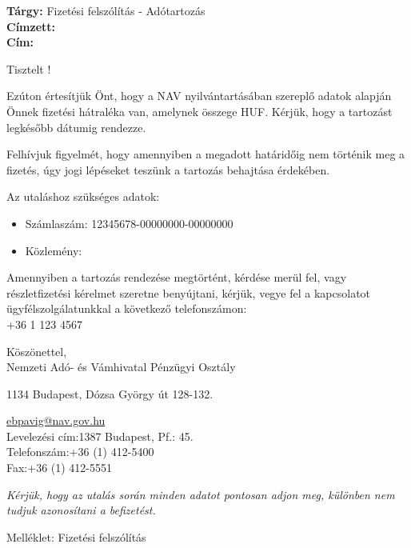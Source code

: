 \documentclass[a4paper,12pt]{letter}
\begin{document}
    \pagestyle{fancy}
    \fancyhf{}
    \fancyhead[R]{\today}
    \fancyfoot[C]{\thepage}


    \begin{flushleft}
        \textbf{Tárgy:} Fizetési felszólítás - Adótartozás \\ [1em]
        \textbf{Címzett:} \nev \\ [1em]
        \textbf{Cím:} \cim
    \end{flushleft}

    \vspace{1.5em}

    Tisztelt \nev!

    Ezúton értesítjük Önt, hogy a NAV nyilvántartásában szereplő adatok alapján Önnek fizetési hátraléka van, amelynek összege \osszeg HUF. Kérjük, hogy a tartozást legkésőbb \hatarido dátumig rendezze.

    Felhívjuk figyelmét, hogy amennyiben a megadott határidőig nem történik meg a fizetés, úgy jogi lépéseket teszünk a tartozás behajtása érdekében.

    Az utaláshoz szükséges adatok:
    \begin{itemize}
        \item Számlaszám: 12345678-00000000-00000000
        \item Közlemény: \kozlemeny
    \end{itemize}

    Amennyiben a tartozás rendezése megtörtént, kérdése merül fel, vagy részletfizetési kérelmet szeretne benyújtani, kérjük, vegye fel a kapcsolatot ügyfélszolgálatunkkal a következő telefonszámon: \\
    +36 1 123 4567

    Köszönettel,\\
    Nemzeti Adó- és Vámhivatal Pénzügyi Osztály \\
    \signature{Nemzeti Adó- és Vámhivatal Pénzügyi Osztály}
    1134 Budapest, Dózsa György út 128-132. \\
    \address{NAV Központi Hivatal, 1134 Budapest, Dózsa György út 128-132. }
    \href{mailto:ebpavig@nav.gov.hu}{ebpavig@nav.gov.hu} \\Levelezési cím:1387 Budapest, Pf.: 45. \\Telefonszám:+36 (1) 412-5400 \\Fax:+36 (1) 412-5551
    \date{\today}

    \vspace{1.5em}
    \textit{Kérjük, hogy az utalás során minden adatot pontosan adjon meg, különben nem tudjuk azonosítani a befizetést.}

    \vspace{1em}
    Melléklet: Fizetési felszólítás
\end{document}
